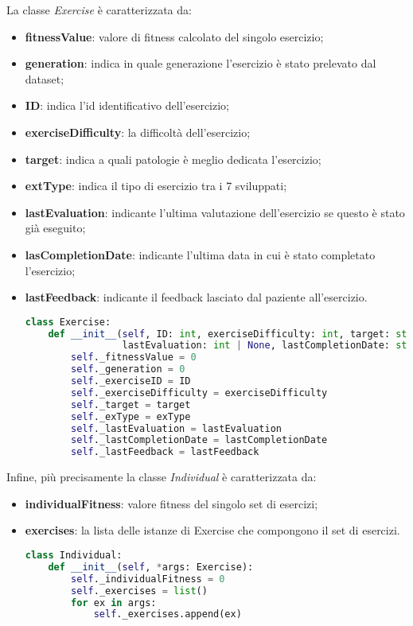 \documentclass{article}
\begin{document}
\bigskip
\label{sec:exerciseImplementation}
La classe \textit{Exercise} è caratterizzata da:
\begin{itemize}
\item\textbf{fitnessValue}: valore di fitness calcolato del singolo esercizio;
\item\textbf{generation}: indica in quale generazione l'esercizio è stato prelevato dal dataset;
\item\textbf{ID}: indica l'id identificativo dell'esercizio;
\item\textbf{exerciseDifficulty}: la difficoltà dell'esercizio;
\item\textbf{target}: indica a quali patologie è meglio dedicata l'esercizio;
\item\textbf{extType}: indica il tipo di esercizio tra i 7 sviluppati;
\item\textbf{lastEvaluation}: indicante l'ultima valutazione dell'esercizio se questo è stato già eseguito;
\item\textbf{lasCompletionDate}: indicante l'ultima data in cui è stato completato l'esercizio;
\item\textbf{lastFeedback}: indicante il feedback lasciato dal paziente all'esercizio.

\begin{lstlisting}[language=Python]
    class Exercise:
    def __init__(self, ID: int, exerciseDifficulty: int, target: str, exType: str,
                 lastEvaluation: int | None, lastCompletionDate: str | None, lastFeedback: int | None):
        self._fitnessValue = 0
        self._generation = 0
        self._exerciseID = ID
        self._exerciseDifficulty = exerciseDifficulty
        self._target = target
        self._exType = exType
        self._lastEvaluation = lastEvaluation
        self._lastCompletionDate = lastCompletionDate
        self._lastFeedback = lastFeedback

\end{lstlisting}
\end{itemize}
\label{sec:individualImplementation}
Infine, più precisamente la classe \textit{Individual} è caratterizzata da:
\begin{itemize}
\item\textbf{individualFitness}: valore fitness del singolo set di esercizi;
\item\textbf{exercises}: la lista delle istanze di Exercise che compongono il set di esercizi.
\begin{lstlisting}[language = Python]
    class Individual:
    def __init__(self, *args: Exercise):
        self._individualFitness = 0
        self._exercises = list()
        for ex in args:
            self._exercises.append(ex)
\end{lstlisting}
\end{itemize}
\end{document}
